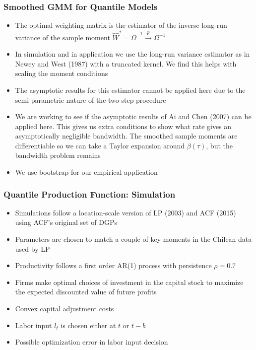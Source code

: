 \documentclass{beamer}
\begin{document}

\begin{frame}
\frametitle{Smoothed GMM for Quantile Models}
\begin{itemize}
	\item The optimal weighting matrix is the estimator of the inverse long-run variance of the sample moment $\hat{W}^{*}=\bar{\Omega}^{-1}\overset{p}{\to}\Omega^{-1}$
	\item In simulation and in application we use the long-run variance estimator as in Newey and West (1987) with a truncated kernel. We find this helps with scaling the moment conditions
	\item The asymptotic results for this estimator cannot be applied here due to the semi-parametric nature of the two-step procedure
	\item We are working to see if the asymptotic results of Ai and Chen (2007) can be applied here. This gives us extra conditions to show what rate gives an asymptotically negligible bandwidth. The smoothed sample moments are differentiable so we can take a Taylor expansion around $\beta(\tau)$, but the bandwidth problem remains
	\item We use bootstrap for our empirical application
\end{itemize}
\end{frame}


\begin{frame}
\frametitle{Quantile Production Function: Simulation}
\begin{itemize}
	\item Simulations follow a location-scale version of LP (2003) and ACF (2015) using ACF's original set of DGPs 
	\item Parameters are chosen to match a couple of key moments in the Chilean data used by LP
	\item Productivity follows a first order AR(1) process with persistence $\rho=0.7$
	\item Firms make optimal choices of investment in the capital stock to maximize the expected discounted value of future profits
	\item Convex capital adjustment costs
	\item Labor input $l_{t}$ is chosen either at $t$ or $t-b$
	\item Possible optimization error in labor input decision
\end{itemize}
\end{frame}
\end{document}
